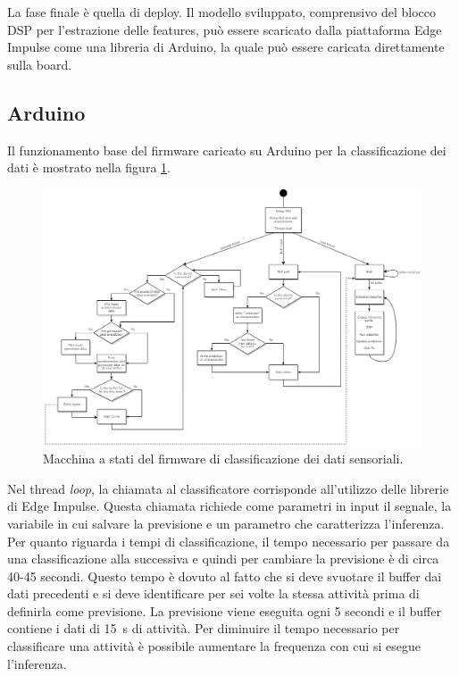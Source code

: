 La fase finale è quella di deploy. Il modello sviluppato, comprensivo del blocco DSP per l'estrazione delle features, può essere scaricato dalla piattaforma Edge Impulse come una libreria di Arduino, la quale può essere caricata direttamente sulla board. 


\subsection{Arduino} \label{arduinoSect}
Il funzionamento base del firmware caricato su Arduino per la classificazione dei dati è mostrato nella figura \ref{fig:SM_classif}.
\begin{figure}[tbh]
	\centering
	\includegraphics[width=\linewidth]{./ImageFiles/SM_classification}
	\caption{Macchina a stati del firmware di classificazione dei dati sensoriali.}
	\label{fig:SM_classif}
\end{figure}

\noindent
Nel thread \textit{loop}, la chiamata al classificatore corrisponde all'utilizzo delle librerie di Edge Impulse. Questa chiamata richiede come parametri in input il segnale, la variabile in cui salvare la previsione e un parametro che caratterizza l'inferenza. Per quanto riguarda i tempi di classificazione, il tempo necessario per passare da una classificazione alla successiva e quindi per cambiare la previsione è di circa 40-45 secondi. Questo tempo è dovuto al fatto che si deve svuotare il buffer dai dati precedenti e si deve identificare per sei volte la stessa attività prima di definirla come previsione. La previsione viene eseguita ogni 5 secondi e il buffer contiene i dati di \SI{15}{\second} di attività. Per diminuire il tempo necessario per classificare una attività è possibile aumentare la frequenza con cui si esegue l'inferenza.